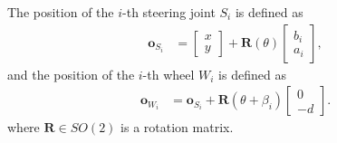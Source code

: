 The position of the $i$-th steering joint $S_i$ is defined as
\begin{align*}
    \bm{o}_{S_i} &=
    \begin{bmatrix}
        x \\
        y
    \end{bmatrix}
    +
    \bm{R}(\theta)
    \begin{bmatrix}
        b_i \\
        a_i
    \end{bmatrix},
\end{align*}
and the position of the $i$-th wheel $W_i$ is defined as
\begin{align*}
    \bm{o}_{W_i} &=
    \bm{o}_{S_i}
    +
    \bm{R}(\theta + \beta_i)
    \begin{bmatrix}
        0 \\
        -d
    \end{bmatrix}.
\end{align*}
where $\bm{R} \in SO(2)$ is a rotation matrix.

